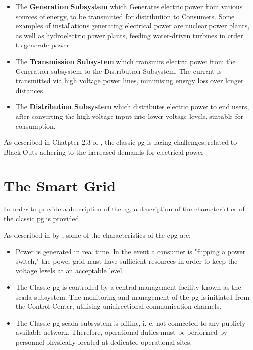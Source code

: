 \begin{itemize}

 \item The \textbf{Generation Subsystem} which Generates electric power from various sources of energy, to be transmitted for distribution to Consumers. Some examples of installations generating electrical power are nuclear power plants, as well as hydroelectric power plants, feeding water-driven turbines in order to generate power.
 \item The \textbf{Transmission Subsystem} which transmits electric power from the Generation subsystem to the Distribution Subsystem. The current is transmitted via high voltage power lines, minimising energy loss over longer distances.
 \item The \textbf{Distribution Subsystem} which distributes electric power to end users, after converting the high voltage input into lower voltage levels, suitable for consumption.
 \end{itemize}

As described in Chatpter 2.3 of \cite{Rihan2018} %
, the classic \acrshort{pg} is facing challenges, related to Black Outs adhering to the increased demands for electrical power . 


\section{The Smart Grid}




In order to provide a description of the \acrfull{sg}, a description of the characteristics of the classic \acrshort{pg} is provided.





As described in  \cite{BlumeStevenW2007Epsb} by \citeauthor{BlumeStevenW2007Epsb}, some of the characteristics of the \acrlong{cpg} are:

\begin{itemize}
\item Power is generated in real time. In the event a consumer is "flipping a power switch," the power grid must have sufficient resources in order to keep the voltage levels at an acceptable level.
\item The Classic \acrlong{pg} is controlled by a central management facility known as the \acrfull{scada} subsystem. The monitoring and management of the \acrshort{pg} is initiated from the Control Center, utilising unidirectional communication channels. 
\item The Classic \acrlong{pg} \acrlong{scada} subsystem is offline, i. e. not connected to any publicly available network. Therefore, operational duties must be performed by personnel physically located at dedicated operational sites.

\end{itemize}

